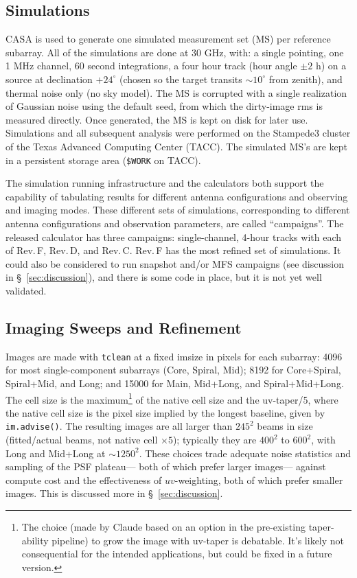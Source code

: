 \documentclass[11pt]{article}
\begin{document}
\subsection{Simulations}
\label{sec:sims}

CASA is used to generate one simulated measurement set (MS) per
reference subarray.  All of the simulations are done at 30 GHz, with:
a single pointing, one 1 MHz channel, 60 second integrations, a four
hour track (hour angle $\pm 2$ h) on a source at declination
$+24^\circ$ (chosen so the target transits $\sim 10^{\circ}$ from
zenith), and thermal noise only (no sky model).  The MS is corrupted
with a single realization of Gaussian noise using the default seed,
from which the dirty-image rms is measured directly. Once generated,
the MS is kept on disk for later use.  Simulations and all subsequent
analysis were performed on the Stampede3 cluster of the Texas Advanced
Computing Center (TACC).  The simulated MS's are kept in a persistent
storage area ({\tt \$WORK} on TACC).

The simulation running infrastructure and the calculators both support
the capability of tabulating results for different antenna
configurations and observing and imaging modes. These different sets
of simulations, corresponding to different antenna configurations and
observation parameters, are called ``campaigns''.  The released
calculator has three campaigns: single-channel, 4-hour tracks with
each of Rev.\,F, Rev.\,D, and Rev.\,C. Rev.\,F has the most refined set of
simulations. It could also be considered to run snapshot and/or MFS
campaigns (see discussion in \S~\ref{sec:discussion}), and there is
some code in place, but it is not yet well validated.

\subsection{Imaging Sweeps and Refinement}
\label{sec:img}

Images are made with {\tt tclean} at a fixed imsize in pixels for each
subarray: 4096 for most single-component subarrays (Core, Spiral,
Mid); 8192 for Core+Spiral, Spiral+Mid, and Long; and 15000 for Main,
Mid+Long, and Spiral+Mid+Long. The cell size is the
maximum\footnote{The choice (made by Claude based on an option in the
pre-existing taper-ability pipeline) to grow the image with uv-taper
is debatable. It's likely not consequential for the intended
applications, but could be fixed in a future version.} of the native
cell size and the uv-taper/5, where the native cell size is the pixel
size implied by the longest baseline, given by {\tt im.advise()}. The
resulting images are all larger than $245^2$ beams in size
(fitted/actual beams, not native cell $\times 5$); typically they are
$400^2$ to $600^2$, with Long and Mid+Long at $\sim 1250^2$.  These
choices trade adequate noise statistics and sampling of the PSF
plateau--- both of which prefer larger images--- against compute
cost and the effectiveness of $uv$-weighting, both of which prefer
smaller images. This is discussed more in \S~\ref{sec:discussion}.
\end{document}
